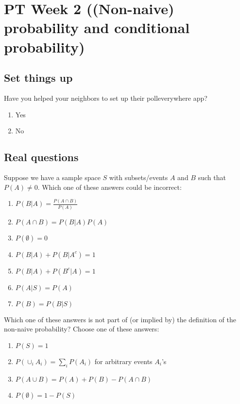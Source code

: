 \documentclass[poll_tutorial_format]{subfiles}
\begin{document}
	\maketitle
		\setcounter{section}{1}
	\section{PT Week 2 ((Non-naive) probability and conditional probability)}
	
	\subsection{Set things up}
	\label{sec:set-things-up}
	
	
	
	\setcounter{theorem}{-1}

	\begin{exercise}
		Have you helped your neighbors to set up their polleverywhere app? 
		\begin{enumerate}
			\item Yes
			\item No
		\end{enumerate}
	\end{exercise}
	
	\subsection{Real questions}
	\label{sec:start-real-questions pt week 2}
			\begin{exercise}
		Suppose we have a sample space $S$ with subsets/events $A$ and $B$ such that $P(A)\neq 0$.
		Which one of these answers could be incorrect:
		\begin{enumerate}
			\item $P(B|A)=\frac{P(A\cap B)}{P(A)}$
			\item $P(A\cap B)=P(B|A)P(A)$
			\item $P(\emptyset)=0$
			\item $P(B|A)+P(B|A^c)=1$
			\item $P(B|A)+P(B^c|A)=1$
			\item $P(A|S)=P(A)$
			\item $P(B)=P(B|S)$
		\end{enumerate}
	\end{exercise}

	


\begin{exercise}
	Which one of these answers is not part of (or implied by) the definition of the non-naive probability?
	Choose one of these answers: 
	\begin{enumerate}
		\item $P(S)=1$
		\item $P(\cup_i A_i) = \sum_i P(A_i)$ for arbitrary events $A_i$'s
		\item $P(A\cup B)=P(A)+P(B)-P(A\cap B)$
		\item $P(\emptyset)=1-P(S)$
	\end{enumerate}
\end{exercise}
\end{document}
